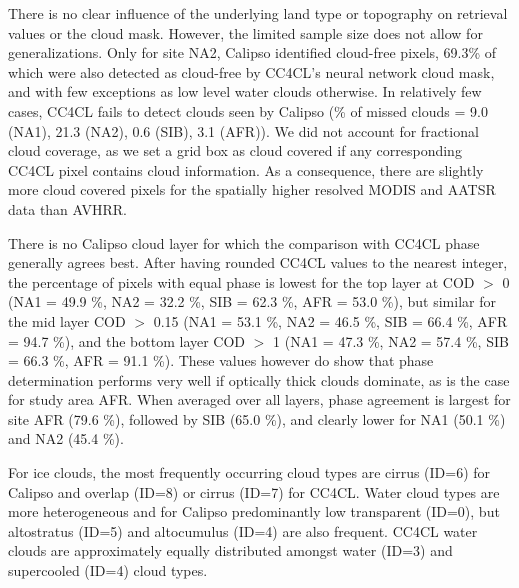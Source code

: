 There is no clear influence of the underlying land type or topography on retrieval values or the cloud mask. However, the limited sample size does not allow for generalizations. Only for site NA2, Calipso identified cloud-free pixels, 69.3\% of which were also detected as cloud-free by CC4CL's neural network cloud mask, and with few exceptions as low level water clouds otherwise. In relatively few cases, CC4CL fails to detect clouds seen by Calipso (\% of missed clouds = 9.0 (NA1), 21.3 (NA2), 0.6 (SIB), 3.1 (AFR)). We did not account for fractional cloud coverage, as we set a grid box as cloud covered if any corresponding CC4CL pixel contains cloud information. As a consequence, there are slightly more cloud covered pixels for the spatially higher resolved MODIS and AATSR data than AVHRR.

There is no Calipso cloud layer for which the comparison with CC4CL phase generally agrees best. After having rounded CC4CL values to the nearest integer, the percentage of pixels with equal phase is lowest for the top layer at COD $>$ 0 (NA1 = 49.9 \%, NA2 = 32.2 \%, SIB = 62.3 \%, AFR = 53.0 \%), but similar for the mid layer COD $>$ 0.15 (NA1 = 53.1 \%, NA2 = 46.5 \%, SIB = 66.4 \%, AFR = 94.7 \%), and the bottom layer COD $>$ 1 (NA1 = 47.3 \%, NA2 = 57.4 \%, SIB = 66.3 \%, AFR = 91.1 \%). These values however do show that phase determination performs very well if optically thick clouds dominate, as is the case for study area AFR. When averaged over all layers, phase agreement is largest for site AFR (79.6 \%), followed by SIB (65.0 \%), and clearly lower for NA1 (50.1 \%) and NA2 (45.4 \%).

For ice clouds, the most frequently occurring cloud types are cirrus (ID=6) for Calipso and overlap (ID=8) or cirrus (ID=7) for CC4CL. Water cloud types are more heterogeneous and for Calipso predominantly low transparent (ID=0), but altostratus (ID=5) and altocumulus (ID=4) are also frequent. CC4CL water clouds are approximately equally distributed amongst water (ID=3) and supercooled (ID=4) cloud types. %

